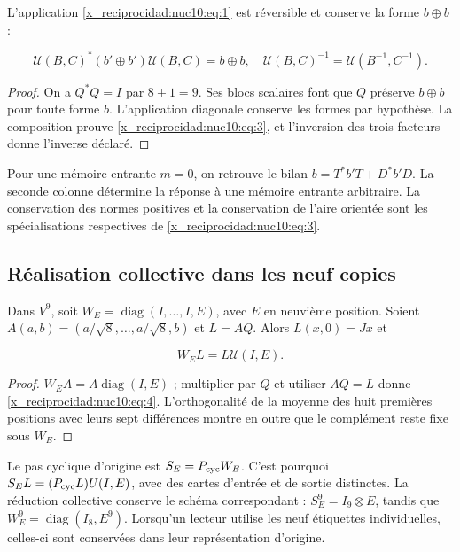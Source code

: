 \begin{theorem}
L’application \eqref{x_reciprocidad:nuc10:eq:1} est réversible et conserve la forme \(b\oplus b\) :



\begin{equation}
\mathcal U(B,C)^*(b'\oplus b')\mathcal U(B,C)=b\oplus b,
\quad\mathcal U(B,C)^{-1}=\mathcal U(B^{-1},C^{-1}).
\label{x_reciprocidad:nuc10:eq:3}
\end{equation}
\end{theorem}



\begin{proof}
On a \(Q^*Q=I\) par \(8+1=9\). Ses blocs scalaires font que \(Q\) préserve \(b\oplus b\) pour toute forme \(b\). L’application diagonale conserve les formes par hypothèse. La composition prouve \eqref{x_reciprocidad:nuc10:eq:3}, et l’inversion des trois facteurs donne l’inverse déclaré.
\end{proof}

Pour une mémoire entrante \(m=0\), on retrouve le bilan \(b=T^*b'T+D^*b'D\). La seconde colonne détermine la réponse à une mémoire entrante arbitraire. La conservation des normes positives et la conservation de l’aire orientée sont les spécialisations respectives de \eqref{x_reciprocidad:nuc10:eq:3}.

\subsection{Réalisation collective dans les neuf copies}

Dans \(V^9\), soit \(W_E=\operatorname{diag}(I,\ldots,I,E)\), avec \(E\) en neuvième position. Soient \(A(a,b)=(a/\sqrt8,\ldots,a/\sqrt8,b)\) et \(L=AQ\). Alors \(L(x,0)=Jx\) et




\begin{equation}
W_E L=L\mathcal U(I,E).
\label{x_reciprocidad:nuc10:eq:4}
\end{equation}



\begin{proof}
\(W_EA=A\operatorname{diag}(I,E)\) ; multiplier par \(Q\) et utiliser \(AQ=L\) donne \eqref{x_reciprocidad:nuc10:eq:4}. L’orthogonalité de la moyenne des huit premières positions avec leurs sept différences montre en outre que le complément reste fixe sous \(W_E\).
\end{proof}

Le pas cyclique d’origine est \(S_E=P_{\rm cyc}W_E\). C’est pourquoi \(S_EL=(P_{\rm cyc}L)U(I,E)\), avec des cartes d’entrée et de sortie distinctes. La réduction collective conserve le schéma correspondant : \(S_E^9=I_9\otimes E\), tandis que \(W_E^9=\operatorname{diag}(I_8,E^9)\). Lorsqu’un lecteur utilise les neuf étiquettes individuelles, celles-ci sont conservées dans leur représentation d’origine.

